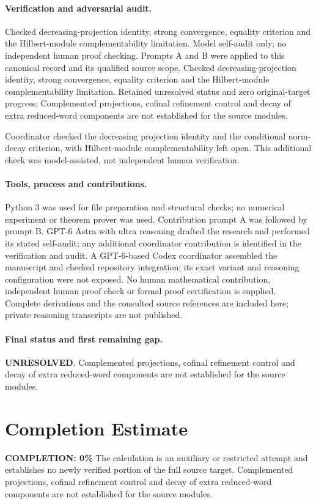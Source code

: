 \documentclass[11pt]{article}
\begin{document}
\paragraph{Verification and adversarial audit.}
Checked decreasing-projection identity, strong convergence, equality criterion and the Hilbert-module complementability limitation. Model self-audit only; no independent human proof checking. Prompts A and B were applied to this canonical record and its qualified source scope. Checked decreasing-projection identity, strong convergence, equality criterion and the Hilbert-module complementability limitation. Retained unresolved status and zero original-target progress; Complemented projections, cofinal refinement control and decay of extra reduced-word components are not established for the source modules.

Coordinator checked the decreasing projection identity and the conditional norm-decay criterion, with Hilbert-module complementability left open. This additional check was model-assisted, not independent human verification.

\paragraph{Tools, process and contributions.}
Python 3 was used for file preparation and structural checks; no numerical experiment or theorem prover was used. Contribution prompt A was followed by prompt B. GPT-6 Astra with ultra reasoning drafted the research and performed its stated self-audit; any additional coordinator contribution is identified in the verification and audit. A GPT-6-based Codex coordinator assembled the manuscript and checked repository integration; its exact variant and reasoning configuration were not exposed. No human mathematical contribution, independent human proof check or formal proof certification is supplied. Complete derivations and the consulted source references are included here; private reasoning transcripts are not published.

\paragraph{Final status and first remaining gap.}
\textbf{UNRESOLVED}. Complemented projections, cofinal refinement control and decay of extra reduced-word components are not established for the source modules.

\section{Completion Estimate}
\noindent\textbf{COMPLETION: 0\%}
The calculation is an auxiliary or restricted attempt and establishes no newly verified portion of the full source target. Complemented projections, cofinal refinement control and decay of extra reduced-word components are not established for the source modules.
\end{document}
